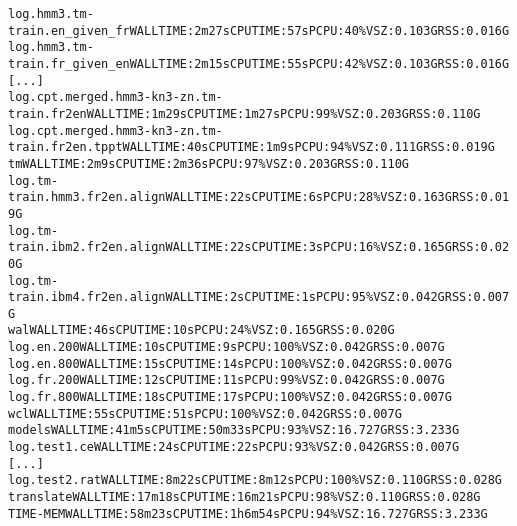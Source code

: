 \documentclass[11pt,letterpaper]{article}
\begin{document}
\begin{tiny}
\begin{alltt}
         log.hmm3.tm-train.en_given_fr                    WALL TIME: 2m27s    CPU TIME: 57s       PCPU: 40\%    VSZ: 0.103G    RSS: 0.016G
         log.hmm3.tm-train.fr_given_en                    WALL TIME: 2m15s    CPU TIME: 55s       PCPU: 42\%    VSZ: 0.103G    RSS: 0.016G
      [...]
         log.cpt.merged.hmm3-kn3-zn.tm-train.fr2en        WALL TIME: 1m29s    CPU TIME: 1m27s     PCPU: 99\%    VSZ: 0.203G    RSS: 0.110G
         log.cpt.merged.hmm3-kn3-zn.tm-train.fr2en.tppt   WALL TIME: 40s      CPU TIME: 1m9s      PCPU: 94\%    VSZ: 0.111G    RSS: 0.019G
      tm                                                  WALL TIME: 2m9s     CPU TIME: 2m36s     PCPU: 97\%    VSZ: 0.203G    RSS: 0.110G
         log.tm-train.hmm3.fr2en.align                    WALL TIME: 22s      CPU TIME: 6s        PCPU: 28\%    VSZ: 0.163G    RSS: 0.019G
         log.tm-train.ibm2.fr2en.align                    WALL TIME: 22s      CPU TIME: 3s        PCPU: 16\%    VSZ: 0.165G    RSS: 0.020G
         log.tm-train.ibm4.fr2en.align                    WALL TIME: 2s       CPU TIME: 1s        PCPU: 95\%    VSZ: 0.042G    RSS: 0.007G
      wal                                                 WALL TIME: 46s      CPU TIME: 10s       PCPU: 24\%    VSZ: 0.165G    RSS: 0.020G
         log.en.200                                       WALL TIME: 10s      CPU TIME: 9s        PCPU: 100\%   VSZ: 0.042G    RSS: 0.007G
         log.en.800                                       WALL TIME: 15s      CPU TIME: 14s       PCPU: 100\%   VSZ: 0.042G    RSS: 0.007G
         log.fr.200                                       WALL TIME: 12s      CPU TIME: 11s       PCPU: 99\%    VSZ: 0.042G    RSS: 0.007G
         log.fr.800                                       WALL TIME: 18s      CPU TIME: 17s       PCPU: 100\%   VSZ: 0.042G    RSS: 0.007G
      wcl                                                 WALL TIME: 55s      CPU TIME: 51s       PCPU: 100\%   VSZ: 0.042G    RSS: 0.007G
   models                                                 WALL TIME: 41m5s    CPU TIME: 50m33s    PCPU: 93\%    VSZ: 16.727G   RSS: 3.233G
      log.test1.ce                                        WALL TIME: 24s      CPU TIME: 22s       PCPU: 93\%    VSZ: 0.042G    RSS: 0.007G
      [...]
      log.test2.rat                                       WALL TIME: 8m22s    CPU TIME: 8m12s     PCPU: 100\%   VSZ: 0.110G    RSS: 0.028G
   translate                                              WALL TIME: 17m18s   CPU TIME: 16m21s    PCPU: 98\%    VSZ: 0.110G    RSS: 0.028G
TIME-MEM                                                  WALL TIME: 58m23s   CPU TIME: 1h6m54s   PCPU: 94\%    VSZ: 16.727G   RSS: 3.233G
\end{alltt}
\end{tiny}
\end{document}
